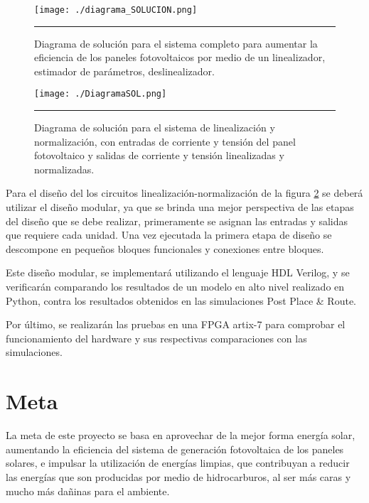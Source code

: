 \begin{figure}[H]
  \centering
    \texttt{[image: ./diagrama\_SOLUCION.png]}
    \rule{35em}{0.5pt}
  \caption[Diagrama de solución para el sistema completo para aumentar la eficiencia de los paneles fotovoltaicos por medio de un linealizador, estimador de parámetros, deslinealizador. ]{ Diagrama de solución para el sistema completo para aumentar la eficiencia de los paneles fotovoltaicos por medio de un linealizador, estimador de parámetros, deslinealizador.}
  \label{fig:DSOL}
\end{figure}

\begin{figure}[H]
  \centering
    \texttt{[image: ./DiagramaSOL.png]}
    \rule{35em}{0.5pt}
  \caption[Diagrama de solución para el sistema de linealización y normalización, con entradas de corriente y tensión del panel fotovoltaico y salidas de corriente y tensión linealizadas y normalizadas.]{ Diagrama de solución para el sistema de linealización y normalización, con entradas de corriente y tensión del panel fotovoltaico y salidas de corriente y tensión linealizadas y normalizadas.}
  \label{fig:DiagramaSOL}
\end{figure}

Para el diseño del los circuitos linealización-normalización de la figura \ref{fig:DiagramaSOL} se deberá utilizar el diseño modular, ya que se brinda una mejor perspectiva de las etapas del diseño que se debe realizar, primeramente se asignan las entradas y salidas que requiere cada unidad. Una vez ejecutada la primera etapa de diseño se descompone en pequeños bloques funcionales y conexiones entre bloques.   

Este diseño modular, se implementará utilizando el lenguaje HDL Verilog, y se verificarán comparando los resultados de un modelo en alto nivel realizado en Python, contra los resultados obtenidos en las simulaciones Post Place \& Route.

Por último, se realizarán las pruebas en una FPGA artix-7 para comprobar el funcionamiento del hardware y sus respectivas comparaciones con las simulaciones. 

\section{Meta}

La meta de este proyecto se basa en aprovechar de la mejor forma energía solar, aumentando la eficiencia del sistema de generación fotovoltaica de los paneles solares, e impulsar la utilización de energías limpias, que contribuyan a reducir las energías que son producidas por medio de hidrocarburos, al ser más caras y mucho más dañinas para el ambiente. 

